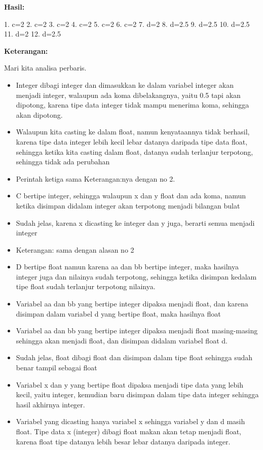 \textbf{Hasil:}

\begin{lcverbatim}
1. c=2
2. c=2
3. c=2
4. c=2
5. c=2
6. c=2
7. d=2
8. d=2.5
9. d=2.5
10. d=2.5
11. d=2
12. d=2.5
\end{lcverbatim}
\textbf{Keterangan:}

Mari kita analisa perbaris.

\begin{itemize}

\item
  Integer dibagi integer dan dimasukkan ke dalam variabel integer akan
  menjadi integer, walaupun ada koma dibelakangnya, yaitu 0.5 tapi akan
  dipotong, karena tipe data integer tidak mampu menerima koma, sehingga
  akan dipotong.
\item
  Walaupun kita casting ke dalam float, namun kenyataannya tidak
  berhasil, karena tipe data integer lebih kecil lebar datanya daripada
  tipe data float, sehingga ketika kita casting dalam float, datanya
  sudah terlanjur terpotong, sehingga tidak ada perubahan
\item
  Perintah ketiga sama Keterangan:nya dengan no 2.
\item
  C bertipe integer, sehingga walaupun x dan y float dan ada koma, namun
  ketika disimpan didalam integer akan terpotong menjadi bilangan bulat
\item
  Sudah jelas, karena x dicasting ke integer dan y juga, berarti semua
  menjadi integer
\item
  Keterangan: sama dengan alasan no 2
\item
  D bertipe float namun karena aa dan bb bertipe integer, maka hasilnya
  integer juga dan nilainya sudah terpotong, sehingga ketika disimpan
  kedalam tipe float sudah terlanjur terpotong nilainya.
\item
  Variabel aa dan bb yang bertipe integer dipaksa menjadi float, dan
  karena disimpan dalam variabel d yang bertipe float, maka hasilnya
  float
\item
  Variabel aa dan bb yang bertipe integer dipaksa menjadi float
  masing-masing sehingga akan menjadi float, dan disimpan didalam
  variabel float d.
\item
  Sudah jelas, float dibagi float dan disimpan dalam tipe float sehingga
  sudah benar tampil sebagai float
\item
  Variabel x dan y yang bertipe float dipaksa menjadi tipe data yang
  lebih kecil, yaitu integer, kemudian baru disimpan dalam tipe data
  integer sehingga hasil akhirnya integer.
\item
  Variabel yang dicasting hanya variabel x sehingga variabel y dan d
  masih float. Tipe data x (integer) dibagi float makan akan tetap
  menjadi float, karena float tipe datanya lebih besar lebar datanya
  daripada integer.
\end{itemize}

